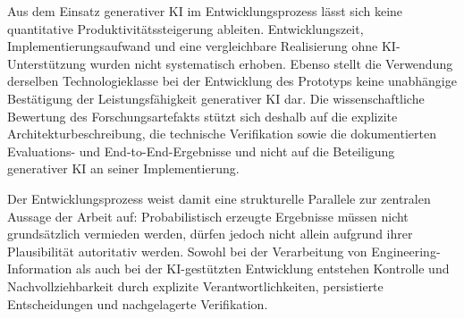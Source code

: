 Aus dem Einsatz generativer KI im Entwicklungsprozess lässt sich keine
quantitative Produktivitätssteigerung ableiten. Entwicklungszeit,
Implementierungsaufwand und eine vergleichbare Realisierung ohne
KI-Unterstützung wurden nicht systematisch erhoben. Ebenso stellt die
Verwendung derselben Technologieklasse bei der Entwicklung des Prototyps
keine unabhängige Bestätigung der Leistungsfähigkeit generativer KI dar. Die
wissenschaftliche Bewertung des Forschungsartefakts stützt sich deshalb auf
die explizite Architekturbeschreibung, die technische Verifikation sowie die
dokumentierten Evaluations- und End-to-End-Ergebnisse und nicht auf die
Beteiligung generativer KI an seiner Implementierung.

Der Entwicklungsprozess weist damit eine strukturelle Parallele zur zentralen
Aussage der Arbeit auf: Probabilistisch erzeugte Ergebnisse müssen nicht
grundsätzlich vermieden werden, dürfen jedoch nicht allein aufgrund ihrer
Plausibilität autoritativ werden. Sowohl bei der Verarbeitung von
Engineering-Information als auch bei der KI-gestützten Entwicklung entstehen
Kontrolle und Nachvollziehbarkeit durch explizite Verantwortlichkeiten,
persistierte Entscheidungen und nachgelagerte Verifikation.
